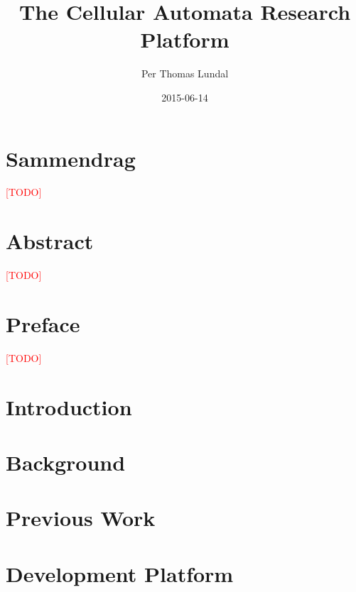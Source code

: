 \documentclass[a4paper,twoside,12pt]{book}
\title{
    {The Cellular Automata Research Platform}\\
    \TODO
}
\author{Per Thomas Lundal}
\date{2015-06-14}
\newcommand\TODO{\textcolor{red}{[TODO]}}
\begin{document}
\maketitle


\cleardoublepage
{}
{}
\chapter*{Sammendrag}
    \TODO

\cleardoublepage
{}
{}
\chapter*{Abstract}
    \TODO

\cleardoublepage
{}
{}
\chapter*{Preface}
    \TODO

\setcounter{tocdepth}{2}

\cleardoublepage
{}
{}
\tableofcontents

\cleardoublepage
{}
{}
\listoffigures

\cleardoublepage
{}
{}
\listoftables


\chapter{Introduction}
    \label{ch:introduction}
    

\chapter{Background}
    \label{ch:background}
    

\chapter{Previous Work}
    \label{ch:previous-work}
    

\chapter{Development Platform}
    \label{ch:development-platform}
    
\end{document}
